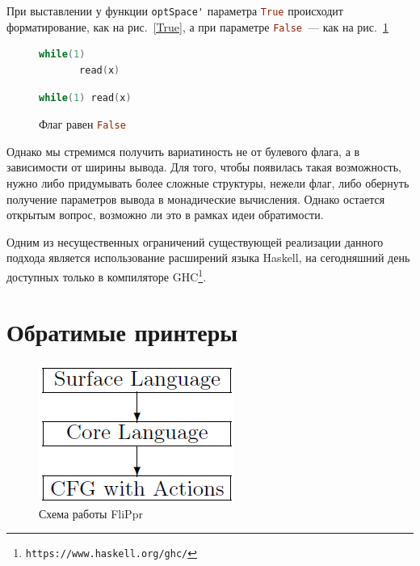 При выставлении у функции \lstinline[language=Haskell]{optSpace'} параметра 
\lstinline[language=Haskell]{True} происходит форматирование, как на рис.~\ref{True}, 
а при параметре \lstinline[language=Haskell]{False}~--- как на рис.~\ref{False}

\begin{figure}[h]
  \centering
  \begin{minipage}[h]{0.4\textwidth}
    \begin{lstlisting}[language = C]
    while(1)
       read(x)
    \end{lstlisting}
    \caption{Флаг равен \lstinline[language=Haskell]{True}}
    \label{True}
  \end{minipage}
  \hfill
  \begin{minipage}[h]{0.4\textwidth}
    \begin{lstlisting}[language = C]
    while(1) read(x)
    \end{lstlisting}
    \caption{Флаг равен \lstinline[language=Haskell]{False}}
    \label{False}
  \end{minipage}
\end{figure}


Однако мы стремимся получить вариатиность не от булевого флага, а в зависимости от ширины вывода. 
Для того, чтобы появилась такая возможность, нужно либо придумывать более сложные структуры, 
нежели флаг, либо обернуть получение параметров вывода в монадические вычисления. Однако
остается открытым вопрос, возможно ли это в рамках идеи обратимости.

Одним из несущественных ограничений существующей реализации данного подхода является
использование расширений языка Haskell, на сегодняшний день доступных только в компиляторе
GHC\footnote{\texttt{https://www.haskell.org/ghc/}}.

\section{Обратимые принтеры}

\begin{figure}
\vspace{-.8cm}
\centering
\includegraphics[scale=0.5]{Aliev/FliPprScheme.png}
\caption{Схема работы FliPpr}
\label{FliPpr}
\end{figure}

